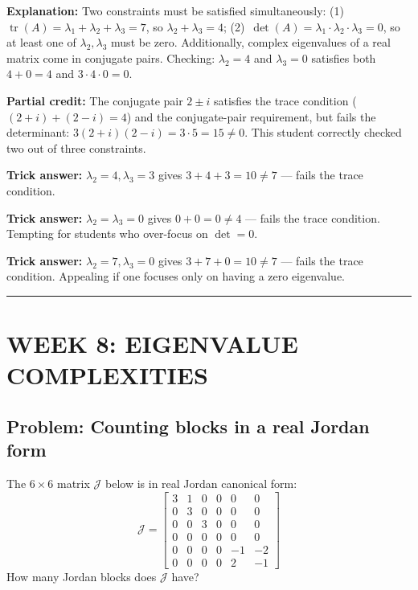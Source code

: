 \documentclass[12pt]{amsart}
\newcommand{\divider}{
  \vspace{-1em}
  \noindent
  \raisebox{-0.15ex}{\textbullet}%
  \hspace{0.5em}%
  \rule[0.5ex]{0.95\textwidth}{1.0pt}%
  \hspace{0.5em}%
  \raisebox{-0.15ex}{\textbullet}%
  \vspace{0em}
}
\begin{document}
\textbf{Explanation:}
Two constraints must be satisfied simultaneously:
(1)~$\operatorname{tr}(A) = \lambda_1 + \lambda_2 + \lambda_3 = 7$,
so $\lambda_2 + \lambda_3 = 4$;
(2)~$\det(A) = \lambda_1 \cdot \lambda_2 \cdot \lambda_3 = 0$, so at
least one of $\lambda_2, \lambda_3$ must be zero.
Additionally, complex eigenvalues of a real matrix come in conjugate pairs.
Checking: $\lambda_2 = 4$ and $\lambda_3 = 0$ satisfies both $4 + 0 = 4$
and $3 \cdot 4 \cdot 0 = 0$.

\textbf{Partial credit:}
The conjugate pair $2 \pm i$ satisfies the trace condition
($(2+i) + (2-i) = 4$) and the conjugate-pair requirement, but fails the
determinant: $3(2+i)(2-i) = 3 \cdot 5 = 15 \neq 0$. This student
correctly checked two out of three constraints.

\textbf{Trick answer:}
$\lambda_2 = 4, \lambda_3 = 3$ gives $3 + 4 + 3 = 10 \neq 7$ --- fails
the trace condition.

\textbf{Trick answer:}
$\lambda_2 = \lambda_3 = 0$ gives $0 + 0 = 0 \neq 4$ --- fails the
trace condition. Tempting for students who over-focus on $\det = 0$.

\textbf{Trick answer:}
$\lambda_2 = 7, \lambda_3 = 0$ gives $3 + 7 + 0 = 10 \neq 7$ --- fails
the trace condition. Appealing if one focuses only on
having a zero eigenvalue.

\divider

\newpage

\section*{WEEK 8: EIGENVALUE COMPLEXITIES}

\subsection*{Problem: Counting blocks in a real Jordan form}

The $6 \times 6$ matrix $\mathcal{J}$ below is in real Jordan canonical form:
$$\mathcal{J} = \begin{bmatrix}
3 & 1 & 0 & 0 & 0 & 0 \\
0 & 3 & 0 & 0 & 0 & 0 \\
0 & 0 & 3 & 0 & 0 & 0 \\
0 & 0 & 0 & 0 & 0 & 0 \\
0 & 0 & 0 & 0 & -1 & -2 \\
0 & 0 & 0 & 0 & 2 & -1
\end{bmatrix}$$
How many Jordan blocks does $\mathcal{J}$ have?
\end{document}
